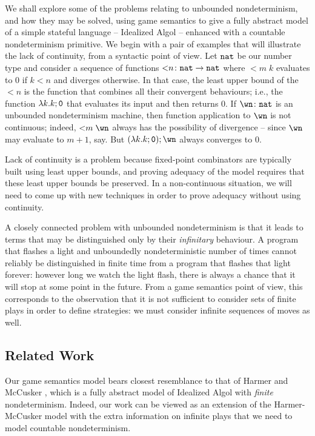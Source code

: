 \documentclass[sigplan,10pt,review]{acmart}\settopmatter{printfolios=true,printccs=false,printacmref=false}
\begin{document}
We shall explore some of the problems relating to unbounded nondeterminism, and how they may be solved, using game semantics to give a fully abstract model of a simple stateful language -- Idealized Algol -- enhanced with a countable nondeterminism primitive.  
We begin with a pair of examples that will illustrate the lack of continuity, from a syntactic point of view.  
Let ${\mathtt{nat}}$ be our number type and consider a sequence of functions ${<}n\colon{\mathtt{nat}}\to{\mathtt{nat}}$ where ${<}m\;k$ evaluates to $0$ if $k<n$ and diverges otherwise.
In that case, the least upper bound of the ${<}n$ is the function that combines all their convergent behaviours; i.e., the function $\lambda k.k;{\mathtt{0}}$ that evaluates its input and then returns $0$.
If $\wn\from\nat$ is an unbounded nondeterminism machine, then function application to $\wn$ is not continuous; indeed, ${<}m\;\wn$ always has the possibility of divergence -- since $\wn$ may evaluate to $m+1$, say.  
But $(\lambda k.k;\0);\wn$ always converges to $0$.

Lack of continuity is a problem because fixed-point combinators are typically built using least upper bounds, and proving adequacy of the model requires that these least upper bounds be preserved.  
In a non-continuous situation, we will need to come up with new techniques in order to prove adequacy without using continuity.

A closely connected problem with unbounded nondeterminism is that it leads to terms that may be distinguished only by their \emph{infinitary} behaviour.  
A program that flashes a light and unboundedly nondeterministic number of times cannot reliably be distinguished in finite time from a program that flashes that light forever: however long we watch the light flash, there is always a chance that it will stop at some point in the future.  
From a game semantics point of view, this corresponds to the observation that it is not sufficient to consider sets of finite plays in order to define strategies: we must consider infinite sequences of moves as well.  

\subsection{Related Work}

Our game semantics model bears closest resemblance to that of Harmer and McCusker \cite{mcCHFiniteND}, which is a fully abstract model of Idealized Algol with \emph{finite} nondeterminism.  
Indeed, our work can be viewed as an extension of the Harmer-McCusker model with the extra information on infinite plays that we need to model countable nondeterminism.  
\end{document}
